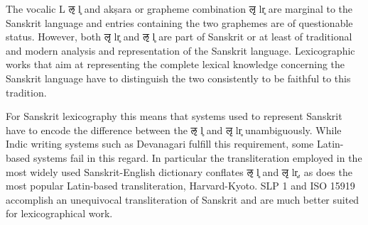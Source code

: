 The vocalic L {\devfont ऌ} l̥ and akṣara or grapheme combination {\devfont लृ} lr̥ are marginal to the Sanskrit language and entries containing the two graphemes are of questionable status. However, both  {\devfont लृ} lr̥ and {\devfont ऌ} l̥ are part of Sanskrit or at least of traditional and modern analysis and representation of the Sanskrit language. Lexicographic works that aim at representing the complete lexical knowledge concerning the Sanskrit language have to distinguish the two consistently to be faithful to this tradition.

For Sanskrit lexicography this means that systems used to represent Sanskrit have to encode the difference between the {\devfont ऌ} l̥ and {\devfont लृ} lr̥ unambiguously. While Indic writing systems such as Devanagari fulfill this requirement, some Latin-based systems fail in this regard. In particular the transliteration employed in the most widely used Sanskrit-English dictionary \citep{mw} conflates {\devfont ऌ} l̥ and {\devfont लृ} lr̥, as does the most popular Latin-based transliteration, Harvard-Kyoto. SLP 1 \citep{ScharfHyman2011} and ISO 15919 accomplish an unequivocal transliteration of Sanskrit and are much better suited for lexicographical work.








